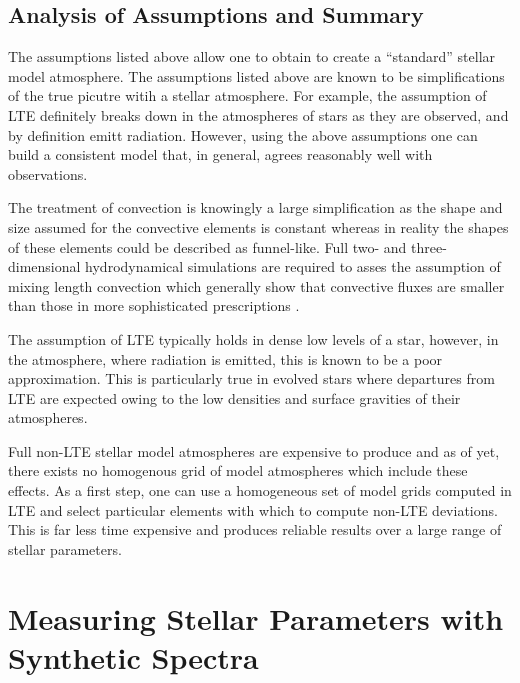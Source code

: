

\subsection{Analysis of Assumptions and Summary} %
\label{sub:assumptions_summary}

The assumptions listed above allow one to obtain to create a ``standard'' stellar model atmosphere.
The assumptions listed above are known to be simplifications of the true picutre witih a stellar atmosphere.
For example, the assumption of LTE definitely breaks down in the atmospheres of stars as they are observed, and by definition emitt radiation.
However, using the above assumptions one can build a consistent model that, in general, agrees reasonably well with observations.

The treatment of convection is knowingly a large simplification as the shape and size assumed for the convective elements is constant whereas in reality the shapes of these elements could be described as funnel-like.
Full two- and three-dimensional hydrodynamical simulations are required to asses the assumption of mixing length convection which generally show that convective fluxes are smaller than those in more sophisticated prescriptions
\citep{2012sse..book.....K}.

The assumption of LTE typically holds in dense low levels of a star, however, in the atmosphere, where radiation is emitted, this is known to be a poor approximation.
This is particularly true in evolved stars where departures from LTE are expected owing to the low densities and surface gravities of their atmospheres.

Full non-LTE stellar model atmospheres are expensive to produce and as of yet, there exists no homogenous grid of model atmospheres which include these effects.
As a first step, one can use a homogeneous set of model grids computed in LTE and select particular elements with which to compute non-LTE deviations.
This is far less time expensive and produces reliable results over a large range of stellar parameters.




\section{Measuring Stellar Parameters with Synthetic Spectra} %
\label{sub:model_grid}

